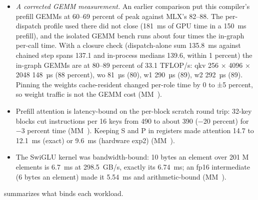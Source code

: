 \begin{itemize}
\item \emph{A corrected GEMM measurement.} An earlier comparison put this compiler's prefill GEMMs at 60–69 percent
  of peak against MLX's 82–88. The per-dispatch profile used there did not close (181~ms of GPU time in a 150~ms
  prefill), and the isolated GEMM bench runs about four times the in-graph per-call time. With a closure check
  (dispatch-alone sum 135.8~ms against chained step spans 137.1 and in-process medians 139.6, within 1 percent) the
  in-graph GEMMs are at 80–89 percent of 33.1 TFLOP/s: qkv 256 × 4096 × 2048 148~µs (88 percent), wo 81~µs (80), w1
  290~µs (89), w2 292~µs (89). Pinning the weights cache-resident changed per-role time by 0 to ±5 percent, so weight
  traffic is not the GEMM cost (MM~).
\item Prefill attention is latency-bound on the per-block scratch round trip: 32-key blocks cut instructions per 16 keys
  from 490 to about 390 (−20 percent) for −3 percent time (MM~). Keeping S and P in registers made attention 14.7
  to 12.1~ms (exact) or 9.6~ms (hardware exp2) (MM~).
\item The SwiGLU kernel was bandwidth-bound: 10 bytes an element over 201 M elements is 6.7~ms at 298.5~GB/s, exactly its
  6.74~ms; an fp16 intermediate (6 bytes an element) made it 5.54~ms and arithmetic-bound (MM~).
\end{itemize}

 summarizes what binds each workload.

